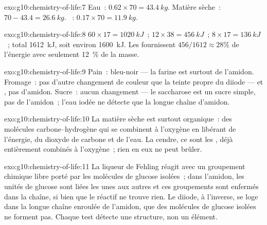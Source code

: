 \begin{solution}{exo:g10:chemistry-of-life:7}
Eau~: $0.62 \times 70 = \qty{43.4}{kg}$. Matière sèche~: $70 - 43.4 =
\qty{26.6}{kg}$. ~: $0.17 \times 70 = \qty{11.9}{kg}$.
\end{solution}

\begin{solution}{exo:g10:chemistry-of-life:8}
 $60 \times 17 = \qty{1020}{kJ}$~;  $12 \times 38 =
\qty{456}{kJ}$~;  $8 \times 17 = \qty{136}{kJ}$~; total
\qty{1612}{kJ}, soit environ \qty{1600}{kJ}. Les  fournissent $456/1612 \approx
28\%$ de l'énergie avec seulement 12~\% de la masse.
\end{solution}

\begin{solution}{exo:g10:chemistry-of-life:9}
Pain~: bleu-noir --- la farine est surtout de l'amidon. Fromage~: pas
d'autre changement de couleur que la teinte propre du diiode ---
 et , pas d'amidon. Sucre~: aucun changement --- le
saccharose est un sucre simple, pas de l'amidon~; l'eau iodée ne
détecte que la longue chaîne d'amidon.
\end{solution}

\begin{solution}{exo:g10:chemistry-of-life:10}
La matière sèche est surtout organique~: des molécules
carbone--hydrogène qui se combinent à l'oxygène en libérant de
l'énergie, du dioxyde de carbone et de l'eau. La cendre, ce sont les
, déjà entièrement combinés à l'oxygène~; rien en eux ne
peut brûler.
\end{solution}

\begin{solution}{exo:g10:chemistry-of-life:11}
La liqueur de Fehling réagit avec un groupement chimique libre porté
par les molécules de glucose isolées~; dans l'amidon, les unités de
glucose sont liées les unes aux autres et ces groupements sont
enfermés dans la chaîne, si bien que le réactif ne trouve rien. Le
diiode, à l'inverse, se loge dans la longue chaîne enroulée de
l'amidon, que des molécules de glucose isolées ne forment pas. Chaque
test détecte une structure, non un élément.
\end{solution}

